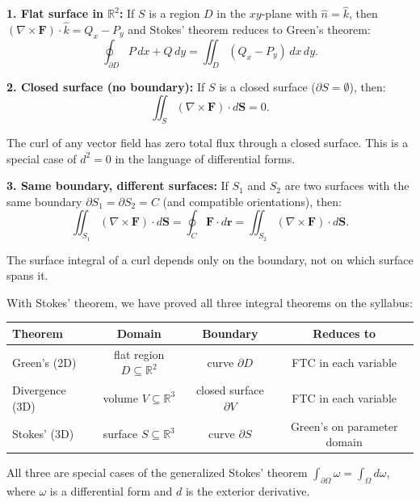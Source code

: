 \documentclass[11pt]{report}
\newcommand{\R}{\mathbb{R}}
\begin{document}
\begin{remark}
\textbf{1. Flat surface in $\R^2$:} If $S$ is a region $D$ in the $xy$-plane with $\hat{n} = \hat{k}$, then $(\nabla \times \mathbf{F}) \cdot \hat{k} = Q_x - P_y$ and Stokes' theorem reduces to Green's theorem:
\[
\oint_{\partial D} P \, dx + Q \, dy = \iint_D (Q_x - P_y) \, dx \, dy.
\]

\textbf{2. Closed surface (no boundary):} If $S$ is a closed surface ($\partial S = \emptyset$), then:
\[
\iint_S (\nabla \times \mathbf{F}) \cdot d\mathbf{S} = 0.
\]

The curl of any vector field has zero total flux through a closed surface. This is a special case of $d^2 = 0$ in the language of differential forms.

\textbf{3. Same boundary, different surfaces:} If $S_1$ and $S_2$ are two surfaces with the same boundary $\partial S_1 = \partial S_2 = C$ (and compatible orientations), then:
\[
\iint_{S_1} (\nabla \times \mathbf{F}) \cdot d\mathbf{S} = \oint_C \mathbf{F} \cdot d\mathbf{r} = \iint_{S_2} (\nabla \times \mathbf{F}) \cdot d\mathbf{S}.
\]

The surface integral of a curl depends only on the boundary, not on which surface spans it.
\end{remark}

\begin{remark}
With Stokes' theorem, we have proved all three integral theorems on the syllabus:

\begin{center}
\renewcommand{\arraystretch}{1.5}
\begin{tabular}{|l|c|c|c|}
\hline
\textbf{Theorem} & \textbf{Domain} & \textbf{Boundary} & \textbf{Reduces to} \\
\hline
Green's (2D) & flat region $D \subseteq \R^2$ & curve $\partial D$ & FTC in each variable \\
\hline
Divergence (3D) & volume $V \subseteq \R^3$ & closed surface $\partial V$ & FTC in each variable \\
\hline
Stokes' (3D) & surface $S \subseteq \R^3$ & curve $\partial S$ & Green's on parameter domain \\
\hline
\end{tabular}
\end{center}

All three are special cases of the generalized Stokes' theorem $\int_{\partial \Omega} \omega = \int_\Omega d\omega$, where $\omega$ is a differential form and $d$ is the exterior derivative.
\end{remark}
\end{document}
